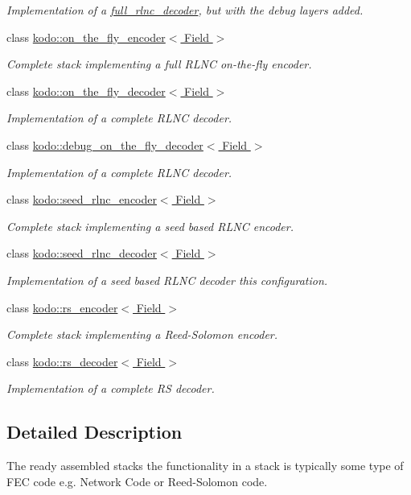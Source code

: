 \begin{DoxyCompactItemize}
\begin{DoxyCompactList}\small\item\em Implementation of a \hyperlink{classkodo_1_1full__rlnc__decoder}{full\-\_\-rlnc\-\_\-decoder}, but with the debug layers added. \end{DoxyCompactList}\item 
class \hyperlink{classkodo_1_1on__the__fly__encoder}{kodo\-::on\-\_\-the\-\_\-fly\-\_\-encoder$<$ Field $>$}
\begin{DoxyCompactList}\small\item\em Complete stack implementing a full R\-L\-N\-C on-\/the-\/fly encoder. \end{DoxyCompactList}\item 
class \hyperlink{classkodo_1_1on__the__fly__decoder}{kodo\-::on\-\_\-the\-\_\-fly\-\_\-decoder$<$ Field $>$}
\begin{DoxyCompactList}\small\item\em Implementation of a complete R\-L\-N\-C decoder. \end{DoxyCompactList}\item 
class \hyperlink{classkodo_1_1debug__on__the__fly__decoder}{kodo\-::debug\-\_\-on\-\_\-the\-\_\-fly\-\_\-decoder$<$ Field $>$}
\begin{DoxyCompactList}\small\item\em Implementation of a complete R\-L\-N\-C decoder. \end{DoxyCompactList}\item 
class \hyperlink{classkodo_1_1seed__rlnc__encoder}{kodo\-::seed\-\_\-rlnc\-\_\-encoder$<$ Field $>$}
\begin{DoxyCompactList}\small\item\em Complete stack implementing a seed based R\-L\-N\-C encoder. \end{DoxyCompactList}\item 
class \hyperlink{classkodo_1_1seed__rlnc__decoder}{kodo\-::seed\-\_\-rlnc\-\_\-decoder$<$ Field $>$}
\begin{DoxyCompactList}\small\item\em Implementation of a seed based R\-L\-N\-C decoder this configuration. \end{DoxyCompactList}\item 
class \hyperlink{classkodo_1_1rs__encoder}{kodo\-::rs\-\_\-encoder$<$ Field $>$}
\begin{DoxyCompactList}\small\item\em Complete stack implementing a Reed-\/\-Solomon encoder. \end{DoxyCompactList}\item 
class \hyperlink{classkodo_1_1rs__decoder}{kodo\-::rs\-\_\-decoder$<$ Field $>$}
\begin{DoxyCompactList}\small\item\em Implementation of a complete R\-S decoder. \end{DoxyCompactList}\end{DoxyCompactItemize}


\subsection{Detailed Description}
The ready assembled stacks the functionality in a stack is typically some type of F\-E\-C code e.\-g. Network Code or Reed-\/\-Solomon code. 